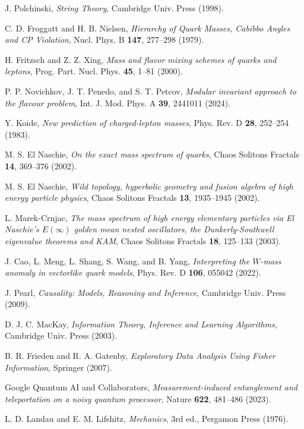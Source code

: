 \documentclass[%
amsmath,amssymb,
aps,
prb,
floatfix,showkeys
]{revtex4-2}
\begin{document}
\begin{thebibliography}{99}
J. Polchinski, {\it String Theory}, Cambridge Univ. Press (1998).

C. D. Froggatt and H. B. Nielsen,
{\it Hierarchy of Quark Masses, Cabibbo Angles and CP Violation},
Nucl. Phys. B {\bf 147}, 277--298 (1979).

H. Fritzsch and Z. Z. Xing,
{\it Mass and flavor mixing schemes of quarks and leptons},
Prog. Part. Nucl. Phys. {\bf 45}, 1--81 (2000).

P. P. Novichkov, J. T. Penedo, and S. T. Petcov, 
{\it Modular invariant approach to the flavour problem},
Int. J. Mod. Phys. A {\bf 39}, 2441011 (2024).
    
Y. Koide, {\it New prediction of charged-lepton masses},
Phys. Rev. D {\bf 28}, 252--254 (1983). 

M. S. El Naschie,
{\it On the exact mass spectrum of quarks}, 
Chaos Solitons Fractals {\bf 14}, 369--376 (2002).

M. S. El Naschie,
{\it Wild topology, hyperbolic geometry and fusion algebra of high energy particle physics},
Chaos Solitons Fractals {\bf 13}, 1935--1945 (2002).

L. Marek-Crnjac,
{\it The mass spectrum of high energy elementary particles via El Naschie's $E(\infty)$ golden mean nested oscillators, the Dunkerly-Southwell eigenvalue theorems and KAM},
Chaos Solitons Fractals {\bf 18}, 125--133 (2003).

J. Cao, L. Meng, L. Shang, S. Wang, and B. Yang,
{\it Interpreting the $W$-mass anomaly in vectorlike quark models},  
Phys. Rev. D {\bf 106}, 055042 (2022).

J. Pearl, {\it Causality: Models, Reasoning and Inference}, Cambridge Univ. Press (2009). 

D. J. C. MacKay, {\it Information Theory, Inference and Learning Algorithms}, Cambridge Univ. Press (2003).

B. R. Frieden and R. A. Gatenby, {\it Exploratory Data Analysis Using Fisher Information}, Springer (2007).
  
Google Quantum AI and Collaborators,
{\it Measurement-induced entanglement and teleportation on a noisy quantum processor},
Nature {\bf 622}, 481--486 (2023).

L. D. Landau and E. M. Lifshitz, {\it Mechanics}, 3rd ed., Pergamon Press (1976).
  

\end{thebibliography}
\end{document}
